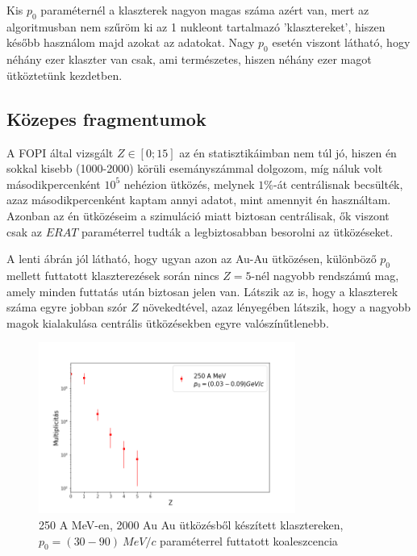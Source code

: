 \documentclass[a4paper,12pt]{article}
\begin{document}
\vspace{5mm}

\par Kis $p_{0}$ paraméternél a klaszterek nagyon magas száma azért van, mert az algoritmusban nem szűröm ki az 1 nukleont tartalmazó 'klasztereket', hiszen később használom majd azokat az adatokat. Nagy $p_{0}$ esetén viszont látható, hogy néhány ezer klaszter van csak, ami természetes, hiszen néhány ezer magot ütköztetünk kezdetben.

\vspace{10mm}

\subsection{Közepes fragmentumok}

\par A FOPI által vizsgált $Z \in [0;15]$ az én statisztikáimban nem túl jó, hiszen én sokkal kisebb (1000-2000) körüli esemányszámmal dolgozom, míg náluk volt másodikpercenként $10^{5}$ nehézion ütközés, melynek $1\%$-át centrálisnak becsülték, azaz másodikpercenként kaptam annyi adatot, mint amennyit én használtam. Azonban az én ütközéseim a szimuláció miatt biztosan centrálisak, ők viszont csak az $ERAT$ paraméterrel tudták a legbiztosabban besorolni az ütközéseket.

\vspace{5mm}

\par A lenti ábrán jól látható, hogy ugyan azon az Au-Au ütközésen, különböző $p_{0}$ mellett futtatott klaszterezések során nincs $Z = 5$-nél nagyobb rendszámú mag, amely minden futtatás után biztosan jelen van. Látszik az is, hogy a klaszterek száma egyre jobban szór $Z$ növekedtével, azaz lényegében látszik, hogy a nagyobb magok kialakulása centrális ütközésekben egyre valószínűtlenebb.

\begin{figure}[!htb]
\centering
\includegraphics[width=0.75\textwidth]{./p0valtozik_klaszterek.png}
\caption{250 A MeV-en, 2000 Au Au ütközésből készített klasztereken, $p_{0} = (30 - 90) ~MeV/c$ paraméterrel futtatott koaleszcencia}
\end{figure}

\vspace{5mm}
\end{document}
